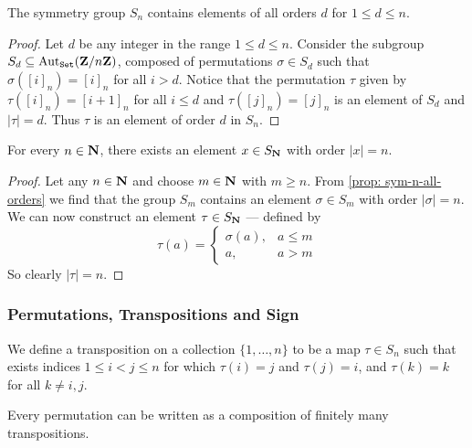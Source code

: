 \begin{proposition}\label{prop: sym-n-all-orders}
    The symmetry group \(S_n\) contains elements of all orders \(d\) for
    \(1 \leq d \leq n\).
\end{proposition}

\begin{proof}
    Let \(d\) be any integer in the range \(1 \leq d \leq n\). Consider the
    subgroup \(S_d \subseteq \operatorname{Aut}_{{\texttt{Set}}}(\mathbf{Z}/n\mathbf{Z})\), composed of permutations
    \(\sigma \in S_d\) such that \(\sigma([i]_n) = [i]_n\) for all \(i > d\).
    Notice that the permutation \(\tau\) given by \(\tau([i]_n) = [i + 1]_n\) for
    all \(i \leq d\) and \(\tau([j]_n) = [j]_n\) is an element of \(S_d\) and
    \(|\tau| = d\). Thus \(\tau\) is an element of order \(d\) in \(S_n\).
\end{proof}

\begin{corollary}
    For every \(n \in \mathbf{N}\), there exists an element \(x \in S_{\mathbf{N}}\) with
    order \(|x| = n\).
\end{corollary}

\begin{proof}
    Let any \(n \in \mathbf{N}\) and choose \(m \in \mathbf{N}\) with \(m \geq n\). From
    \cref{prop: sym-n-all-orders} we find that the group \(S_m\) contains
    an element \(\sigma \in S_m\) with order \(|\sigma| = n\). We can now
    construct an element \(\tau \in S_{\mathbf{N}}\) --- defined by
    \[
        \tau(a) =
        \begin{cases}
            \sigma(a), & a \leq m \\
            a,         & a > m
        \end{cases}
    \]
    So clearly \(|\tau| = n\).
\end{proof}

\subsubsection{Permutations, Transpositions and Sign}

\begin{definition}[Transposition]
    \label{def: transposition}
    We define a transposition on a collection \(\{1, \dots, n\}\) to be a map
    \(\tau \in S_n\) such that exists indices \(1 \leq i < j \leq n\)
    for which \(\tau(i) = j\) and \(\tau(j) = i\), and \(\tau(k) = k\) for all
    \(k \neq i, j\).
\end{definition}

\begin{proposition}\label{prop: permutations to transpositions}
    Every permutation can be written as a composition of finitely many
    transpositions.
\end{proposition}


